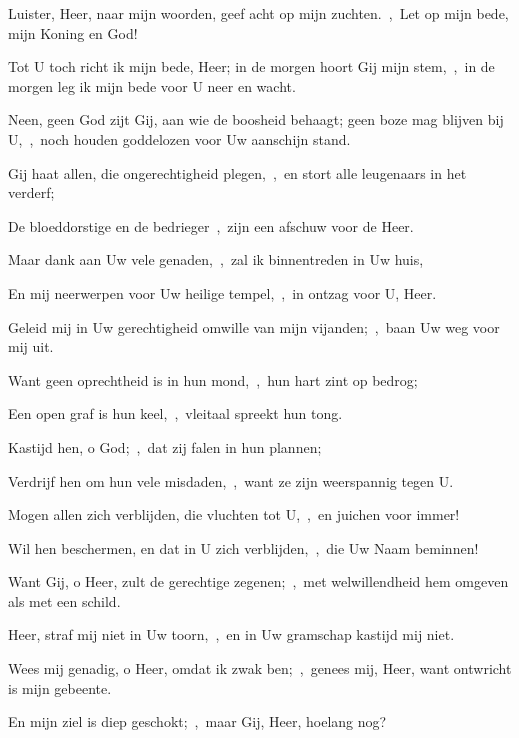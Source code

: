 \documentclass[12pt,twoside,a5paper]{article}
\begin{document}
\begin{halfparskip}

   Luister, Heer, naar mijn woorden, geef acht op mijn zuchten.~\sep\ Let op mijn bede, mijn Koning en God!


  Tot U toch richt ik mijn bede, Heer; in de morgen hoort Gij mijn stem,~\sep\ in de morgen leg ik mijn bede voor U neer en wacht.

  Neen, geen God zijt Gij, aan wie de boosheid behaagt; geen boze mag blijven bij U,~\sep\ noch houden goddelozen voor Uw aanschijn stand.

  Gij haat allen, die ongerechtigheid plegen,~\sep\ en stort alle leugenaars in het verderf;

  De bloeddorstige en de bedrieger~\sep\ zijn een afschuw voor de Heer.

  Maar dank aan Uw vele genaden,~\sep\ zal ik binnentreden in Uw huis,

  En mij neerwerpen voor Uw heilige tempel,~\sep\ in ontzag voor U, Heer.

  Geleid mij in Uw gerechtigheid omwille van mijn vijanden;~\sep\ baan Uw weg voor mij uit.

  Want geen oprechtheid is in hun mond,~\sep\ hun hart zint op bedrog;

  Een open graf is hun keel,~\sep\ vleitaal spreekt hun tong.

  Kastijd hen, o God;~\sep\ dat zij falen in hun plannen;

  Verdrijf hen om hun vele misdaden,~\sep\ want ze zijn weerspannig tegen U.

  Mogen allen zich verblijden, die vluchten tot U,~\sep\ en juichen voor immer!

  Wil hen beschermen, en dat in U zich verblijden,~\sep\ die Uw Naam beminnen!

  Want Gij, o Heer, zult de gerechtige zegenen;~\sep\ met welwillendheid hem omgeven als met een schild.

   Heer, straf mij niet in Uw toorn,~\sep\ en in Uw gramschap kastijd mij niet.

  Wees mij genadig, o Heer, omdat ik zwak ben;~\sep\ genees mij, Heer, want ontwricht is mijn gebeente.

  En mijn ziel is diep geschokt;~\sep\ maar Gij, Heer, hoelang nog?


\end{halfparskip}
\end{document}
